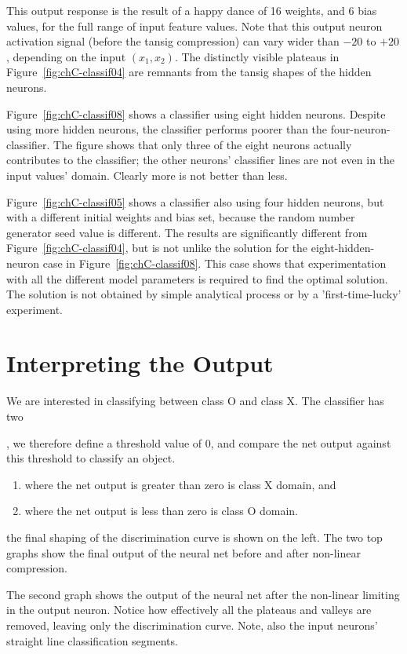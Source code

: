 This output response is the result of a happy dance of 16 weights, and 6 bias values, for the full range of input feature values.  Note that this output neuron activation signal (before the tansig compression) can vary wider than $-20$ to $+20$, depending on the input  $(x_1,x_2)$.    The distinctly visible plateaus in Figure~\ref{fig:chC-classif04} are remnants from the tansig shapes of the hidden neurons.  

Figure~\ref{fig:chC-classif08} shows a classifier using eight hidden neurons.  Despite using more hidden neurons, the classifier performs poorer than the four-neuron-classifier.  The figure shows that only three of the eight neurons actually contributes to the classifier; the other neurons' classifier lines are not even in the input values' domain.  Clearly more is not better than less.

Figure~\ref{fig:chC-classif05} shows a classifier also using four hidden neurons, but with a different initial weights and bias set, because the random number generator seed value is different. The results are significantly different from Figure~\ref{fig:chC-classif04}, but is not unlike the solution for the eight-hidden-neuron case in Figure~\ref{fig:chC-classif08}.  This case shows that experimentation with all the different model parameters is required to find the optimal solution.  The solution is not obtained by simple analytical process or by a 'first-time-lucky' experiment.


\section{Interpreting the Output}

We are  interested in classifying between class O and class X.  The classifier has two 

, we therefore define a threshold value of $0$, and compare the net output against this threshold to classify an object. 
\begin{enumerate}
\item where the net output is greater than zero is class X domain, and 
\item where the net output is less than zero is class O domain.  
\end{enumerate} 
the final shaping of the discrimination curve is shown on the left.  The two top graphs show the final output of the neural net before and after non-linear compression.  

The second graph shows the output of the neural net after the non-linear limiting in the output neuron.  Notice how effectively all the plateaus and valleys are removed, leaving only the discrimination curve.  Note, also the input neurons' straight line classification segments.

